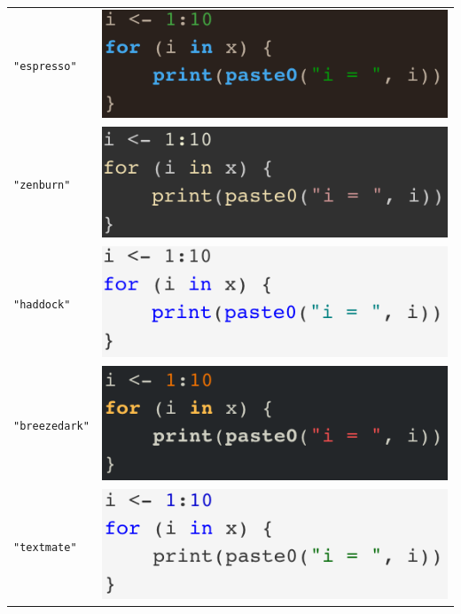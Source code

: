 \documentclass[
  a4paper,
  pandoc,
  ja=standard,
  jafont=haranoaji]{bxjsbook}
\begin{document}
\begin{longtable}[]{@{}ll@{}}
\texttt{"espresso"} &
\includegraphics{./Figs/Markdown/Highlight_Espresso.png} \\
\texttt{"zenburn"} &
\includegraphics{./Figs/Markdown/Highlight_Zenburn.png} \\
\texttt{"haddock"} &
\includegraphics{./Figs/Markdown/Highlight_Haddock.png} \\
\texttt{"breezedark"} &
\includegraphics{./Figs/Markdown/Highlight_Breezedark.png} \\
\texttt{"textmate"} &
\includegraphics{./Figs/Markdown/Highlight_Textmate.png} \\
\bottomrule
\end{longtable}
\end{document}
